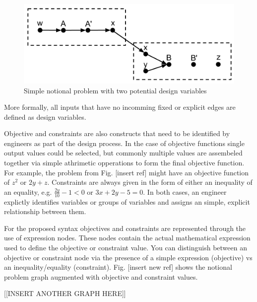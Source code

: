 \begin{figure}[htb!]
  \begin{center}
    \includegraphics[width=.6\textwidth]{images/design_vars_graph}
  \end{center}
  \caption{Simple notional problem with two potential design variables \label{f:design vars}}
\end{figure}

More formally, all inputs that have no incomming fixed or explicit edges are defined
as design variables. 

Objective and constraints are also constructs that need to be identified by engineers 
as part of the design process. In the case of objective functions single output values 
could be selected, but commonly multiple values are assembeled together via simple 
athrimetic opperations to form the final objective function. For example, the problem from 
Fig. [insert ref] might have an objective function of $z^2$ or $2y + z$. Constraints are 
always given in the form of either an inequality of an equality, e.g. 
$\frac{2y}{10}-1<0$ or $3x+2y - 5=0$. In both cases, an engineer explictly identifies variables 
or groups of variables and assigns an simple, explicit relationship between them. 

For the proposed syntax objectives and constraints are represented through the use of 
expression nodes. These nodes contain the actual mathematical expression used to define the 
objective or constraint value. You can distinguish between an objective or constraint node 
via the presence of a simple expression (objective) vs an inequality/equality (constraint). 
Fig. [insert new ref] shows the notional problem graph augmented with objective and 
constraint values. 

[[INSERT ANOTHER GRAPH HERE]]


